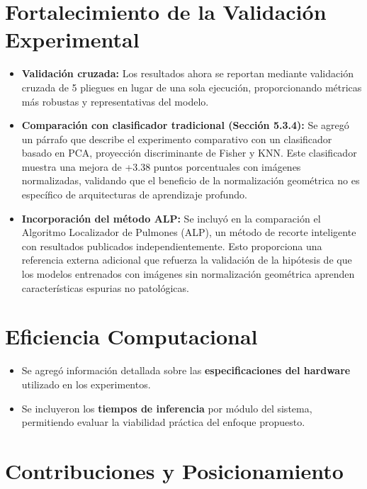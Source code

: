 \documentclass[12pt,letterpaper]{article}
\begin{document}
\section{Fortalecimiento de la Validación Experimental}

\begin{itemize}[leftmargin=*, itemsep=0.3em]
    \item \textbf{Validación cruzada:} Los resultados ahora se reportan mediante validación cruzada de 5 pliegues en lugar de una sola ejecución, proporcionando métricas más robustas y representativas del modelo.

    \item \textbf{Comparación con clasificador tradicional (Sección 5.3.4):} Se agregó un párrafo que describe el experimento comparativo con un clasificador basado en PCA, proyección discriminante de Fisher y KNN. Este clasificador muestra una mejora de +3.38 puntos porcentuales con imágenes normalizadas, validando que el beneficio de la normalización geométrica no es específico de arquitecturas de aprendizaje profundo.

    \item \textbf{Incorporación del método ALP:} Se incluyó en la comparación el Algoritmo Localizador de Pulmones (ALP), un método de recorte inteligente con resultados publicados independientemente. Esto proporciona una referencia externa adicional que refuerza la validación de la hipótesis de que los modelos entrenados con imágenes sin normalización geométrica aprenden características espurias no patológicas.
\end{itemize}

\section{Eficiencia Computacional}

\begin{itemize}[leftmargin=*, itemsep=0.3em]
    \item Se agregó información detallada sobre las \textbf{especificaciones del hardware} utilizado en los experimentos.
    \item Se incluyeron los \textbf{tiempos de inferencia} por módulo del sistema, permitiendo evaluar la viabilidad práctica del enfoque propuesto.
\end{itemize}

\section{Contribuciones y Posicionamiento}
\end{document}
